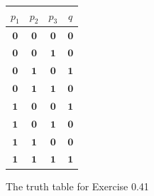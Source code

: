 \begin{figure}[tb]
\begin{center}
\begin{tabular}{ccc|c}
$p_1$ & $p_2$ & $p_3$ & $q$\\
\hline
$\pmb{0}$ & $\pmb{0}$ & $\pmb{0}$ & $\pmb{0}$\\
$\pmb{0}$ & $\pmb{0}$ & $\pmb{1}$ & $\pmb{0}$\\
$\pmb{0}$ & $\pmb{1}$ & $\pmb{0}$ & $\pmb{1}$\\
$\pmb{0}$ & $\pmb{1}$ & $\pmb{1}$ & $\pmb{0}$\\
$\pmb{1}$ & $\pmb{0}$ & $\pmb{0}$ & $\pmb{1}$\\
$\pmb{1}$ & $\pmb{0}$ & $\pmb{1}$ & $\pmb{0}$\\
$\pmb{1}$ & $\pmb{1}$ & $\pmb{0}$ & $\pmb{0}$\\
$\pmb{1}$ & $\pmb{1}$ & $\pmb{1}$ & $\pmb{1}$
\end{tabular}
\end{center}
\caption{The truth table for Exercise 0.41}\label{fig-0.8}
\end{figure}

